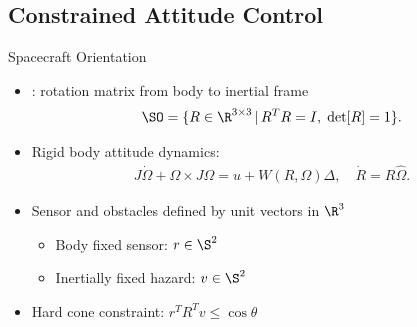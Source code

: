 \subsection[Autonomous Spacecraft attitude control with obstacles]{Constrained Attitude Control}



\begin{frame}{Spacecraft Orientation}\label{slide:attitude_control} %

\begin{itemize}

    \item {}: rotation matrix from body to inertial frame \hyperlink{slide:attitude_kinematics}{}
     \[\SO =  \{R\in\R^{3\times 3}\,|\, R^TR=I,\;\mathrm{det}[R]=1\} . \]
    \item Rigid body attitude dynamics:
    \begin{gather*}
        J\dot\Omega + \Omega\times J\Omega = u+W(R,\Omega)\Delta , \quad \dot R = R\hat\Omega .
    \end{gather*}

    \item Sensor and obstacles defined by unit vectors in \( \R^3 \) 
        \begin{itemize}
            \item Body fixed sensor: \( r \in \S^2\)
            \item Inertially fixed hazard: \( v \in \S^2 \)
        \end{itemize} 
    \vs
    \item Hard cone constraint: \( r^T R^T v \leq \cos \theta \)
    
\end{itemize}

\end{frame}   %

